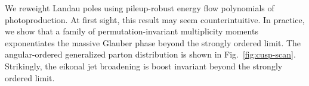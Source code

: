 We reweight Landau poles using pileup-robust energy flow polynomials of
photoproduction. At first sight, this result may seem counterintuitive.
In practice, we show that a family of permutation-invariant multiplicity
moments exponentiates the massive Glauber phase beyond the strongly
ordered limit. The angular-ordered generalized parton distribution is
shown in Fig.~\ref{fig:cusp-scan}. Strikingly, the eikonal jet
broadening is boost invariant beyond the strongly ordered limit.

